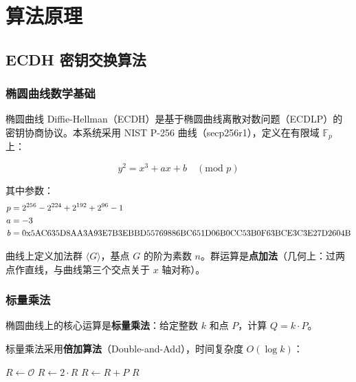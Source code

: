 \documentclass[12pt]{article}
\begin{document}
\newpage

\section{算法原理}

\subsection{ECDH 密钥交换算法}

\subsubsection{椭圆曲线数学基础}

椭圆曲线 Diffie-Hellman（ECDH）是基于椭圆曲线离散对数问题（ECDLP）的密钥协商协议。本系统采用 NIST P-256 曲线（secp256r1），定义在有限域 $\mathbb{F}_p$ 上：

\begin{equation}
y^2 = x^3 + ax + b \quad (\text{mod } p)
\end{equation}

其中参数：
\begin{align}
p &= 2^{256} - 2^{224} + 2^{192} + 2^{96} - 1 \notag \\
a &= -3 \notag \\
b &= \text{0x5AC635D8AA3A93E7B3EBBD55769886BC651D06B0CC53B0F63BCE3C3E27D2604B} \notag
\end{align}

曲线上定义加法群 $\langle G \rangle$，基点 $G$ 的阶为素数 $n$。群运算是\textbf{点加法}（几何上：过两点作直线，与曲线第三个交点关于 $x$ 轴对称）。

\subsubsection{标量乘法}

椭圆曲线上的核心运算是\textbf{标量乘法}：给定整数 $k$ 和点 $P$，计算 $Q = k \cdot P$。

标量乘法采用\textbf{倍加算法}（Double-and-Add），时间复杂度 $O(\log k)$：

\begin{algorithm}[H]
\caption{标量乘法（Double-and-Add）}
\begin{algorithmic}[1]
    \State $R \gets \mathcal{O}$ 
        \State $R \gets 2 \cdot R$ 
            \State $R \gets R + P$ 
        \EndIf
    \EndFor
    \State \Return $R$
\EndFunction
\end{algorithmic}
\end{algorithm}
\end{document}
